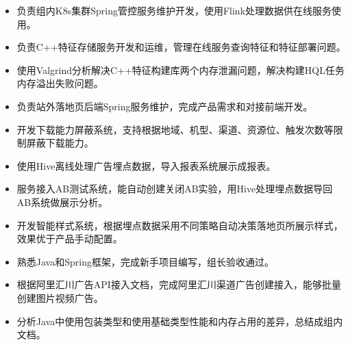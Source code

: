 \documentclass{resume}
\begin{document}

\begin{itemize}
  \item 负责组内K8s集群Spring管控服务维护开发，使用Flink处理数据供在线服务使用。
  \item 负责C++特征存储服务开发和运维，管理在线服务查询特征和特征部署问题。
  \item 使用Valgrind分析解决C++特征构建库两个内存泄漏问题，解决构建HQL任务内存溢出失败问题。
\end{itemize}

\begin{itemize}
  \item 负责站外落地页后端Spring服务维护，完成产品需求和对接前端开发。
  \item 开发下载能力屏蔽系统，支持根据地域、机型、渠道、资源位、触发次数等限制屏蔽下载能力。
  \item 使用Hive离线处理广告埋点数据，导入报表系统展示成报表。
  \item 服务接入AB测试系统，能自动创建关闭AB实验，用Hive处理埋点数据导回AB系统做展示分析。
  \item 开发智能样式系统，根据埋点数据采用不同策略自动决策落地页所展示样式，效果优于产品手动配置。
\end{itemize}

\begin{itemize}
  \item 熟悉Java和Spring框架，完成新手项目编写，组长验收通过。
  \item 根据阿里汇川广告API接入文档，完成阿里汇川渠道广告创建接入，能够批量创建图片视频广告。
  \item 分析Java中使用包装类型和使用基础类型性能和内存占用的差异，总结成组内文档。
\end{itemize}
\end{document}
